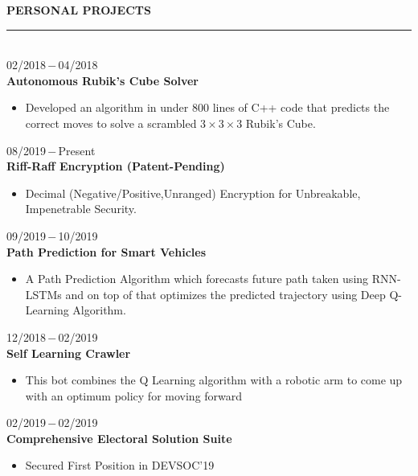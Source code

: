 \documentclass[a4paper, 12pt]{article}
\begin{document}
    \begin{flushleft}
        \textbf{PERSONAL PROJECTS}\\\noindent\rule{\textwidth}{1pt}\\02/2018\,$-$\,04/2018\\\textbf{Autonomous Rubik's Cube Solver}\\\begin{itemize}
            \item Developed an algorithm in under 800 lines of C++ code that predicts the correct moves to solve a scrambled $3\times3\times3$ Rubik's Cube.
        \end{itemize}
        
        08/2019\,$-$\,Present\\
        \textbf{Riff-Raff Encryption (Patent-Pending)}\\\begin{itemize}
            \item Decimal (Negative/Positive,Unranged) Encryption for Unbreakable, Impenetrable Security.
        \end{itemize}
        
        09/2019\,$-$\,10/2019\\
        \textbf{Path Prediction for Smart Vehicles}\\\begin{itemize}
            \item A Path Prediction Algorithm which forecasts future path taken using RNN-LSTMs and on top of that optimizes the predicted trajectory using Deep Q-Learning Algorithm.
        \end{itemize}
        
        12/2018\,$-$\,02/2019\\
        \textbf{Self Learning Crawler}\\\begin{itemize}
            \item This bot combines the Q Learning algorithm with a robotic arm to come up with an optimum policy for moving forward
        \end{itemize}
        
        02/2019\,$-$\,02/2019\\
        \textbf{Comprehensive Electoral Solution Suite}\\\begin{itemize}
            \item Secured First Position in DEVSOC'19
        \end{itemize}
        

\end{flushleft}
\end{document}
